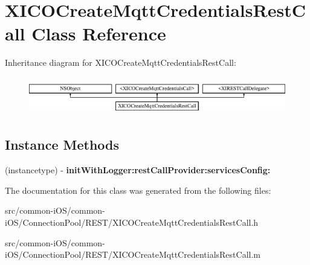 \hypertarget{interface_x_i_c_o_create_mqtt_credentials_rest_call}{}\section{X\+I\+C\+O\+Create\+Mqtt\+Credentials\+Rest\+Call Class Reference}
\label{interface_x_i_c_o_create_mqtt_credentials_rest_call}
Inheritance diagram for X\+I\+C\+O\+Create\+Mqtt\+Credentials\+Rest\+Call\+:\begin{figure}[H]
\begin{center}
\leavevmode
\includegraphics[height=1.681682cm]{interface_x_i_c_o_create_mqtt_credentials_rest_call}
\end{center}
\end{figure}
\subsection*{Instance Methods}
\begin{DoxyCompactItemize}
\item 
\hypertarget{interface_x_i_c_o_create_mqtt_credentials_rest_call_a7d9507322a264fd6c4861109511f1dc1}{}\label{interface_x_i_c_o_create_mqtt_credentials_rest_call_a7d9507322a264fd6c4861109511f1dc1} 
(instancetype) -\/ {\bfseries init\+With\+Logger\+:rest\+Call\+Provider\+:services\+Config\+:}
\end{DoxyCompactItemize}


The documentation for this class was generated from the following files\+:\begin{DoxyCompactItemize}
\item 
src/common-\/i\+O\+S/common-\/i\+O\+S/\+Connection\+Pool/\+R\+E\+S\+T/X\+I\+C\+O\+Create\+Mqtt\+Credentials\+Rest\+Call.\+h\item 
src/common-\/i\+O\+S/common-\/i\+O\+S/\+Connection\+Pool/\+R\+E\+S\+T/X\+I\+C\+O\+Create\+Mqtt\+Credentials\+Rest\+Call.\+m\end{DoxyCompactItemize}
